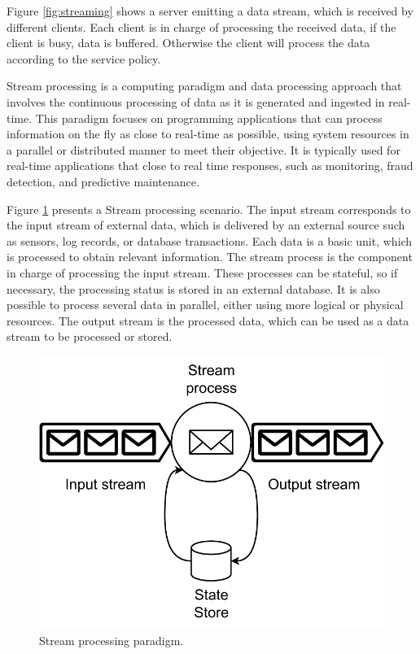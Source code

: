 Figure \ref{fig:streaming} shows a server emitting a data stream, which is received by different clients. Each client is in charge of processing the received data, if the client is busy, data is buffered. Otherwise the client will process the data according to the service policy.


Stream processing is a computing paradigm and data processing approach that involves the continuous processing of data as it is generated and ingested in real-time. This paradigm focuses on programming applications that can process information on the fly as close to real-time as possible, using system resources in a parallel or distributed manner to meet their objective. It is typically used for real-time applications that close to real time responses, such as monitoring, fraud detection, and predictive maintenance.

Figure \ref{fig:stream-processing} presents a Stream processing scenario. The input stream corresponds to the input stream of external data, which is delivered by an external source such as sensors, log records, or database transactions. Each data is a basic unit, which is processed to obtain relevant information. The stream process is the component in charge of processing the input stream.
These processes can be stateful, so if necessary, the processing status is stored in an external database. It is also possible to process several data in parallel, either using more logical or physical resources. The output stream is the processed data, which can be used as a data stream to be processed or stored.

\begin{figure}[ht!]
  \centering
    \includegraphics[scale=0.6]{figures/concepts/StreamProcessing.pdf}
  \caption{Stream processing paradigm.}
  \label{fig:stream-processing}
\end{figure}

